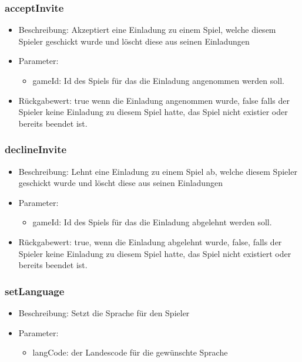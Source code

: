 \documentclass[a4paper]{scrreprt}
\begin{document}
	\subsubsection{acceptInvite}
	\begin{itemize}
		\item Beschreibung: Akzeptiert eine Einladung zu einem Spiel, welche diesem Spieler geschickt wurde und löscht diese aus seinen Einladungen
		\item Parameter:
		\begin{itemize}
			\item gameId: Id des Spiels für das die Einladung angenommen werden soll.
		\end{itemize}
		\item Rückgabewert: true wenn die Einladung angenommen wurde, false falls der Spieler keine Einladung zu diesem Spiel hatte, das Spiel nicht existier oder bereits beendet ist. 
	\end{itemize}
	\subsubsection{declineInvite}
	\begin{itemize}
		\item Beschreibung: Lehnt eine Einladung zu einem Spiel ab, welche diesem Spieler geschickt wurde und löscht diese aus seinen Einladungen
		\item Parameter:
		\begin{itemize}
			\item gameId: Id des Spiels für das die Einladung abgelehnt werden soll.
		\end{itemize}
		\item Rückgabewert: true, wenn die Einladung abgelehnt wurde, false, falls der Spieler keine Einladung zu diesem Spiel hatte, das Spiel nicht existiert oder bereits beendet ist. 
	\end{itemize}
	\subsubsection{setLanguage}
	\begin{itemize}
		\item Beschreibung: Setzt die Sprache für den Spieler
		\item Parameter:
		\begin{itemize}
			\item langCode: der Landescode für die gewünschte Sprache
		\end{itemize}
	\end{itemize}
\end{document}
